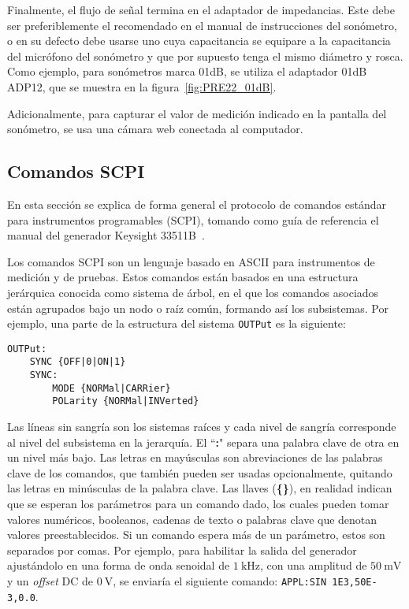 Finalmente, el flujo de señal termina en el adaptador de impedancias.
Este debe ser preferiblemente el recomendado en el manual de instrucciones del sonómetro, o en su defecto debe usarse uno cuya capacitancia se equipare a la capacitancia del micrófono del sonómetro y que por supuesto tenga el mismo diámetro y rosca.
Como ejemplo, para sonómetros marca 01dB, se utiliza el adaptador 01dB ADP12, que se muestra en la figura~\ref{fig:PRE22_01dB}.

Adicionalmente, para capturar el valor de medición indicado en la pantalla del sonómetro, se usa una cámara web conectada al computador.

\subsection{Comandos SCPI}
\label{subsec:scpi_commands}
En esta sección se explica de forma general el protocolo de comandos estándar para instrumentos programables (SCPI), tomando como guía de referencia el manual del generador Keysight 33511B~\citeyearpar{Keysight2015}.

Los comandos SCPI son un lenguaje basado en ASCII para instrumentos de medición y de pruebas.
Estos comandos están basados en una estructura jerárquica conocida como sistema de árbol, en el que los comandos asociados están agrupados bajo un nodo o raíz común, formando así los subsistemas.
Por ejemplo, una parte de la estructura del sistema \texttt{\small OUTPut} es la siguiente:
%
\begin{Verbatim}[fontsize=\footnotesize]
OUTPut:
    SYNC {OFF|0|ON|1}
    SYNC:
        MODE {NORMal|CARRier}
        POLarity {NORMal|INVerted}
\end{Verbatim}

Las líneas sin sangría son los sistemas raíces y cada nivel de sangría corresponde al nivel del subsistema en la jerarquía.
El ``\textbf{:}" separa una palabra clave de otra en un nivel más bajo.
Las letras en mayúsculas son abreviaciones de las palabras clave de los comandos, que también pueden ser usadas opcionalmente, quitando las letras en minúsculas de la palabra clave.
Las llaves (\textbf{\{\}}), en realidad indican que se esperan los parámetros para un comando dado, los cuales pueden tomar valores numéricos, booleanos, cadenas de texto o palabras clave que denotan valores preestablecidos.
Si un comando espera más de un parámetro, estos son separados por comas.
Por ejemplo, para habilitar la salida del generador ajustándolo en una forma de onda senoidal de $\qty{1}{\kHz}$, con una amplitud de $\qty{50}{\mV}$ y un \emph{offset} DC de $\qty{0}{\V}$, se enviaría el siguiente comando: \texttt{\small APPL:SIN 1E3,50E-3,0.0}.

